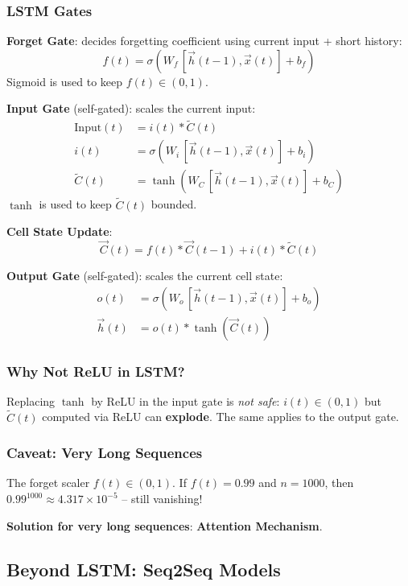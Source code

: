\documentclass[11pt,a4paper]{article}
\newcommand{\vx}{\vec{x}}
\newcommand{\vh}{\vec{h}}
\newcommand{\vC}{\vec{C}}
\begin{document}
\subsubsection{LSTM Gates}

\textbf{Forget Gate}: decides forgetting coefficient using current input + short history:
\[
f(t) = \sigma\!\left(W_f\, [\vh(t-1), \vec{x}(t)] + b_f\right)
\]
Sigmoid is used to keep $f(t) \in (0, 1)$.

\textbf{Input Gate} (self-gated): scales the current input:
\begin{align*}
\text{Input}(t) &= i(t) * \tilde{C}(t) \\
i(t) &= \sigma\!\left(W_i\,[\vh(t-1), \vx(t)] + b_i\right) \\
\tilde{C}(t) &= \tanh\!\left(W_C\,[\vh(t-1), \vx(t)] + b_C\right)
\end{align*}
$\tanh$ is used to keep $\tilde{C}(t)$ bounded.

\textbf{Cell State Update}:
\[
\vC(t) = f(t) * \vC(t-1) + i(t) * \tilde{C}(t)
\]

\textbf{Output Gate} (self-gated): scales the current cell state:
\begin{align*}
o(t) &= \sigma\!\left(W_o\,[\vh(t-1), \vx(t)] + b_o\right) \\
\vh(t) &= o(t) * \tanh(\vC(t))
\end{align*}

\subsubsection{Why Not ReLU in LSTM?}

\begin{warningbox}
Replacing $\tanh$ by ReLU in the input gate is \emph{not safe}: $i(t) \in (0,1)$ but $\tilde{C}(t)$ computed via ReLU can \textbf{explode}. The same applies to the output gate.
\end{warningbox}

\subsubsection{Caveat: Very Long Sequences}

The forget scaler $f(t) \in (0, 1)$. If $f(t) = 0.99$ and $n = 1000$, then $0.99^{1000} \approx 4.317 \times 10^{-5}$ -- still vanishing!

\textbf{Solution for very long sequences}: \textbf{Attention Mechanism}.

\subsection{Beyond LSTM: Seq2Seq Models}
\end{document}
